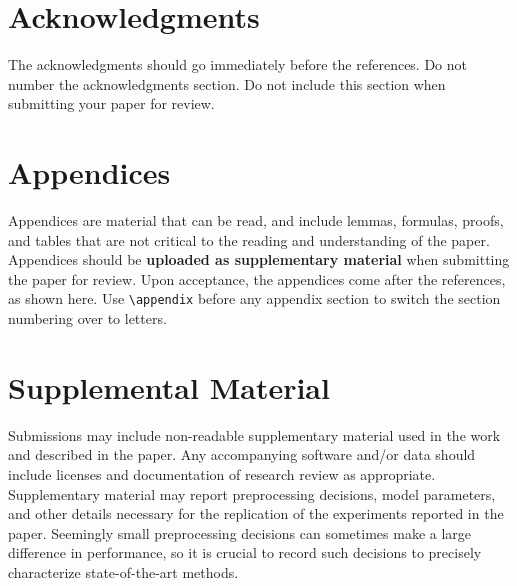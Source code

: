 \documentclass[11pt,a4paper]{article}
\begin{document}
\section*{Acknowledgments}

The acknowledgments should go immediately before the references.  Do
not number the acknowledgments section. Do not include this section
when submitting your paper for review. \\


\appendix

\section{Appendices}
\label{sec:appendix}
Appendices are material that can be read, and include lemmas, formulas, proofs, and tables that are not critical to the reading and understanding of the paper. 
Appendices should be \textbf{uploaded as supplementary material} when submitting the paper for review. Upon acceptance, the appendices come after the references, as shown here. Use
\verb|\appendix| before any appendix section to switch the section
numbering over to letters.


\section{Supplemental Material}
\label{sec:supplemental}
Submissions may include non-readable supplementary material used in the work and described in the paper. Any accompanying software and/or data should include licenses and documentation of research review as appropriate. Supplementary material may report preprocessing decisions, model parameters, and other details necessary for the replication of the experiments reported in the paper. Seemingly small preprocessing decisions can sometimes make a large difference in performance, so it is crucial to record such decisions to precisely characterize state-of-the-art methods. 
\end{document}
